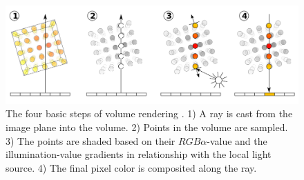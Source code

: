 \begin{figure}[h]
    \centering
    \includegraphics[width=1.0\textwidth]{figures/volume-rendering.png}
    \caption{The four basic steps of volume rendering \cite{wiki:Volume_ray_casting}. 1) A ray is cast from the image plane into the volume. 2) Points in the volume are sampled. 3) The points are shaded based on their $RGB\alpha$-value and the illumination-value gradients in relationship with the local light source. 4) The final pixel color is composited along the ray.}
    \label{fig:volume-rendering}
\end{figure}